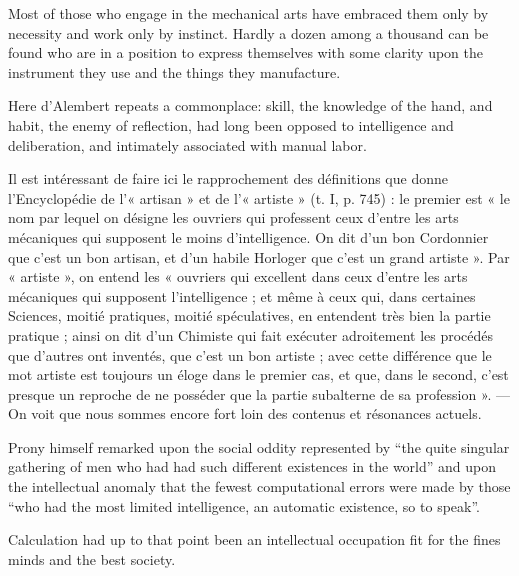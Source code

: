 \documentclass[version=last,draft=true,paper=A4,portrait,twoside=true,twocolumn=false,headinclude=false,footinclude=false,fontsize=12,BCOR=20mm,DIV=calc,pagesize=auto,titlepage=firstiscover,mpinclude=true,open=right,chapterprefix=true,numbers=autoendperiod,headsepline=false,headings=twolinechapter,parskip=false]{scrbook}
\begin{document}
\begin{displayquote}
Most of those who engage in the mechanical arts have embraced them only by
necessity and work only by instinct. Hardly a dozen among a thousand can be
found who are in a position to express themselves with some clarity upon
the instrument  they use and the things they manufacture.
\end{displayquote}

Here d'Alembert repeats a commonplace: skill, the knowledge of the hand,
and habit, the enemy of reflection, had long been opposed to intelligence
and deliberation, and intimately associated with manual labor. 

\begin{displayquote}
Il est intéressant de faire ici le rapprochement des définitions que donne
l'Encyclopédie de l'« artisan » et de l'« artiste » (t. I, p. 745) : le
premier est « le nom par lequel on désigne les ouvriers qui professent ceux
d'entre les arts mécaniques qui supposent le moins d'intelligence. On dit
d'un bon Cordonnier que c'est un bon artisan, et d'un habile Horloger que
c'est un grand artiste ». Par « artiste », on entend les « ouvriers qui
excellent dans ceux d'entre les arts mécaniques qui supposent
l'intelligence ; et même à ceux qui, dans certaines Sciences, moitié
pratiques, moitié spéculatives, en entendent très bien la partie pratique ;
ainsi on dit d'un Chimiste qui fait exécuter adroitement les procédés que
d'autres ont inventés, que c'est un bon artiste ; avec cette différence que
le mot artiste est toujours un éloge dans le premier cas, et que, dans le
second, c'est presque un reproche de ne posséder que la partie subalterne
de sa profession ». — On voit que nous sommes encore fort loin des contenus
et résonances actuels. 
\end{displayquote}

\begin{displayquote}
Prony himself remarked upon the social oddity represented by ``the quite
singular gathering of men who had had such different existences in the
world'' and upon the intellectual anomaly that the fewest computational
errors were made by those ``who had the most limited intelligence, an
automatic existence, so to speak''.
\end{displayquote}

Calculation had up to that point been an intellectual occupation fit for
the fines minds and the best society. 
\end{document}
